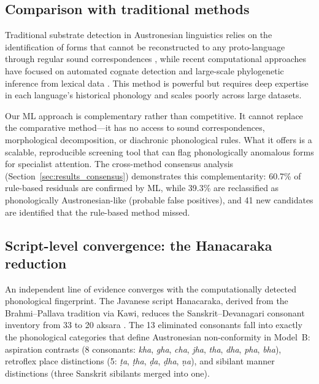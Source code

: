 \documentclass[12pt]{article}
\begin{document}
\subsection{Comparison with traditional methods}

Traditional substrate detection in Austronesian linguistics relies on the identification of forms that cannot be reconstructed to any proto-language through regular sound correspondences \citep{blust2009, blust2010}, while recent computational approaches have focused on automated cognate detection \citep{list2012} and large-scale phylogenetic inference from lexical data \citep{jaeger2018}.
This method is powerful but requires deep expertise in each language's historical phonology and scales poorly across large datasets.

Our ML approach is complementary rather than competitive.
It cannot replace the comparative method---it has no access to sound correspondences, morphological decomposition, or diachronic phonological rules.
What it offers is a scalable, reproducible screening tool that can flag phonologically anomalous forms for specialist attention.
The cross-method consensus analysis (Section~\ref{sec:results_consensus}) demonstrates this complementarity: 60.7\% of rule-based residuals are confirmed by ML, while 39.3\% are reclassified as phonologically Austronesian-like (probable false positives), and 41 new candidates are identified that the rule-based method missed.

\subsection{Script-level convergence: the Hanacaraka reduction}
\label{sec:hanacaraka}

An independent line of evidence converges with the computationally detected phonological fingerprint.
The Javanese script Hanacaraka, derived from the Brahmi--Pallava tradition via Kawi, reduces the Sanskrit--Devanagari consonant inventory from 33 to 20 aksara \citep{casparis1975}.
The 13 eliminated consonants fall into exactly the phonological categories that define Austronesian non-conformity in Model~B: aspiration contrasts (8 consonants: \textit{kha}, \textit{gha}, \textit{cha}, \textit{jha}, \textit{tha}, \textit{dha}, \textit{pha}, \textit{bha}), retroflex place distinctions (5: \textit{\d{t}a}, \textit{\d{t}ha}, \textit{\d{d}a}, \textit{\d{d}ha}, \textit{\d{n}a}), and sibilant manner distinctions (three Sanskrit sibilants merged into one).
\end{document}

